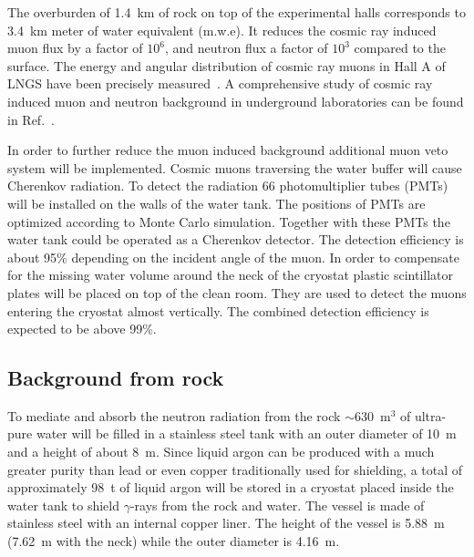 The overburden of 1.4~km of rock on top of the experimental halls corresponds to 3.4~km meter of water equivalent (m.w.e). It reduces the cosmic ray induced muon flux by a factor of $10^{6}$, and neutron flux a factor of $10^{3}$ compared to the surface. The energy and angular distribution of cosmic ray muons in Hall A of LNGS have been precisely measured~\cite{Amb95, Lip91, Amb03}. A comprehensive study of cosmic ray induced muon and neutron background in underground laboratories can be found in Ref.~\cite{Mei06}.

In order to further reduce the muon induced background additional muon veto system will be implemented. Cosmic muons traversing the water buffer will cause Cherenkov radiation. To detect the radiation 66 photomultiplier tubes (PMTs) will be installed on the walls of the water tank. The positions of PMTs are optimized according to Monte Carlo simulation. Together with these PMTs the water tank could be operated as a Cherenkov detector. The detection efficiency is about 95\% depending on the incident angle of the muon. In order to compensate for the missing water volume around the neck of the cryostat plastic scintillator plates will be placed on top of the clean room. They are used to detect the muons entering the cryostat almost vertically. The combined detection efficiency is expected to be above 99\%.

\subsection{Background from rock}
\label{sec:gerda:rock}
To mediate and absorb the neutron radiation from the rock $\sim 630$~m$^{3}$ of ultra-pure water will be filled in a stainless steel tank with an outer diameter of 10~m and a height of about 8~m. Since liquid argon can be produced with a much greater purity than lead or even copper traditionally used for shielding, a total of approximately 98~t of liquid argon will be stored in a cryostat placed inside the water tank to shield $\gamma$-rays from the rock and water. The vessel is made of stainless steel with an internal copper liner. The height of the vessel is 5.88~m (7.62~m with the neck) while the outer diameter is 4.16~m.

